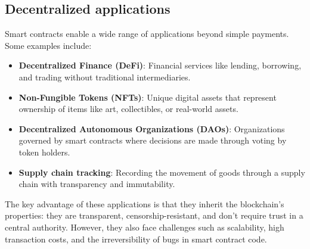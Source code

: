 \subsection{Decentralized applications}
Smart contracts enable a wide range of applications beyond simple payments. Some examples include:

\begin{itemize}
  \item \textbf{Decentralized Finance (DeFi)}: Financial services like lending, borrowing, and trading without traditional intermediaries.
  \item \textbf{Non-Fungible Tokens (NFTs)}: Unique digital assets that represent ownership of items like art, collectibles, or real-world assets.
  \item \textbf{Decentralized Autonomous Organizations (DAOs)}: Organizations governed by smart contracts where decisions are made through voting by token holders.
  \item \textbf{Supply chain tracking}: Recording the movement of goods through a supply chain with transparency and immutability.
\end{itemize}

The key advantage of these applications is that they inherit the blockchain's properties: they are transparent, censorship-resistant, and don't require trust in a central authority. However, they also face challenges such as scalability, high transaction costs, and the irreversibility of bugs in smart contract code.